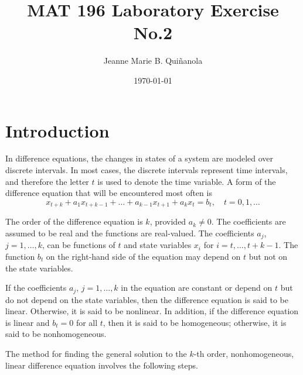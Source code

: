 \documentclass [a4paper]{article}
\title{MAT 196 Laboratory Exercise No.2}
\author{Jeanne Marie B. Quiñanola}
\date{\today}
\begin{document}
\maketitle

\section{Introduction}
In difference equations, the changes in states of a system are modeled over discrete intervals. In most cases, the discrete intervals represent time intervals, and therefore the letter \(t\) is used to denote the time variable.
A form of the difference equation that will be encountered most often is 
\[
x_{t + k} + a_1 x_{t+k-1} + \ldots + a_{k-1} x_{t+1} + a_k x_t = b_t, \quad t = 0, 1,\ldots\]

The order of the difference equation is \(k\), provided \(a_k \neq 0\). The coefficients are assumed to be real and the functions are real-valued. The coefficients \(a_j\), \(j = 1, \ldots, k\), can be functions of \(t\) and state variables \(x_i\) for \(i = t, \ldots, t + k - 1\). The function \(b_t\) on the right-hand side of the equation may depend on \(t\) but not on the state variables.

If the coefficients \(a_j\), \(j = 1, \ldots, k\) in the equation are constant or depend on \(t\) but do not depend on the state variables, then the difference equation is said to be linear. Otherwise, it is said to be nonlinear. In addition, if the difference equation is linear and \(b_t = 0\) for all \(t\), then it is said to be homogeneous; otherwise, it is said to be nonhomogeneous.

The method for finding the general solution to the \(k\)-th order, nonhomogeneous, linear difference equation involves the following steps.
\end{document}

